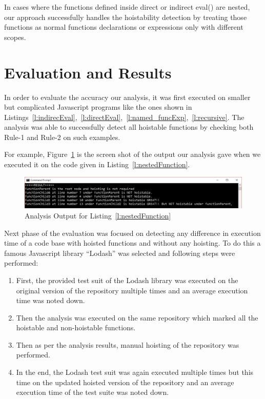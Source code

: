 \documentclass[authoryear,preprint]{sigplanconf}
\begin{document}
In cases where the functions defined inside direct or indirect eval() are nested, our approach successfully handles the hoistability detection by treating those functions as normal functions declarations or expressions only with different scopes.

\section{Evaluation and Results}
\label{sec:evaluation}

In order to evaluate the accuracy our analysis, it was first executed on smaller but complicated Javascript programs like the ones shown in Listings~\ref{l:indirecEval},~\ref{l:directEval},~\ref{l:named_funcExp},~\ref{l:recursive}. The analysis was able to successfully detect all hoistable functions by checking both Rule-1 and Rule-2 on such examples. \par For example, Figure~\ref{fig:output} is the screen shot of the output our analysis gave when we executed it on the code given in Listing~\ref{l:nestedFunction}.

\begin{figure}[H]
  \centering
  \includegraphics[width=\linewidth]{result.png}
  \caption{Analysis Output for Listing~\ref{l:nestedFunction}}
  \label{fig:output}
\end{figure}


Next phase of the evaluation was focused on detecting any difference in execution time of a code base with hoisted functions and without any hoisting. To do this a famous Javascript library \enquote{Lodash} was selected and following steps were performed:


\begin{enumerate}
  \item First, the provided test suit of the Lodash library was executed on the original version of the repository multiple times and an average execution time was noted down.
  \item Then the analysis was executed on the same repository which marked all the hoistable and non-hoistable functions.  
  \item Then as per the analysis results, manual hoisting of the repository was performed.
  \item In the end, the Lodash test suit was again executed multiple times but this time on the updated hoisted version of the repository and an average execution time of the test suite was noted down.
  \end{enumerate}
\end{document}
